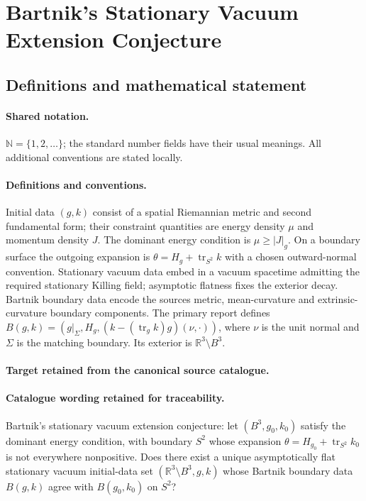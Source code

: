 \documentclass[11pt]{article}
\begin{document}
\section{Bartnik’s Stationary Vacuum Extension Conjecture}\label{statement}

\subsection{Definitions and mathematical statement}

\paragraph{Shared notation.}$\mathbb N=\{1,2,\ldots\}$; the standard number fields have their usual meanings. All additional conventions are stated locally.


\paragraph{Definitions and conventions.}
Initial data $(g,k)$ consist of a spatial Riemannian metric and second fundamental form; their constraint quantities are energy density $\mu$ and momentum density $J$. The dominant energy condition is $\mu\geq|J|_g$. On a boundary surface the outgoing expansion is $\theta=H_g+\operatorname{tr}_{S^2}k$ with a chosen outward-normal convention. Stationary vacuum data embed in a vacuum spacetime admitting the required stationary Killing field; asymptotic flatness fixes the exterior decay. Bartnik boundary data encode the source\textquotesingle s metric, mean-curvature and extrinsic-curvature boundary components. The primary report defines $B(g,k)=(g|_\Sigma,H_g,(k-(\operatorname{tr}_gk)g)(\nu,\cdot))$, where $\nu$ is the unit normal and $\Sigma$ is the matching boundary. Its exterior is $\mathbb R^3\setminus B^3$.

\paragraph{Target retained from the canonical source catalogue.}
\paragraph{Catalogue wording retained for traceability.}
Bartnik's stationary vacuum extension conjecture: let $(B^3,g_0,k_0)$ satisfy the dominant energy condition, with boundary $S^2$ whose expansion $\theta=H_{g_0}+\operatorname{tr}_{S^2}k_0$ is not everywhere nonpositive. Does there exist a unique asymptotically flat stationary vacuum initial-data set $(\mathbb{R}^3\setminus B^3,g,k)$ whose Bartnik boundary data $B(g,k)$ agree with $B(g_0,k_0)$ on $S^2$?
\end{document}
